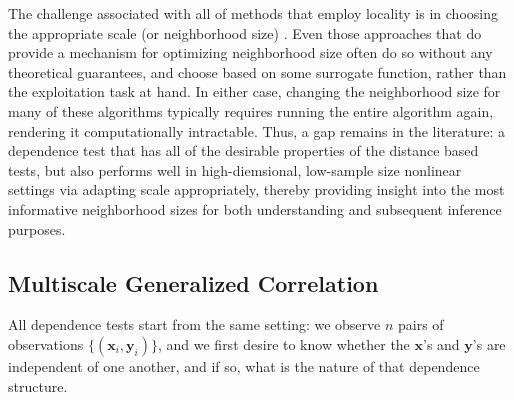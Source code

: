 \documentclass[11pt]{article}
\providecommand{\mb}[1]{\boldsymbol{#1}}
\newcommand{\mbx}{\ensuremath{\mb{x}}}
\newcommand{\mby}{\ensuremath{\mb{y}}}
\begin{document}
The challenge associated with all of methods that employ locality is in choosing the appropriate scale (or neighborhood size) \cite{ShenVogelsteinPriebe2016}.  Even those approaches that do provide a mechanism for optimizing  neighborhood size often do so without any theoretical guarantees, and choose based on some surrogate function, rather than the exploitation task at hand. In either case, changing the neighborhood size for many of these algorithms typically requires running the entire algorithm again, rendering it computationally intractable. 
Thus, a gap remains in the literature: a dependence test that has all of the desirable properties of the distance based tests, but also performs well in high-diemsional, low-sample size nonlinear settings via adapting scale appropriately, thereby providing insight into the most informative neighborhood sizes for both understanding and subsequent inference purposes.  




\subsection*{Multiscale Generalized Correlation}
\label{s:mgc}

All dependence tests start from the same setting: we observe $n$ pairs of observations $\{(\mb{x}_i,\mb{y}_i)\}$, and we first desire to know whether the \mbx's and \mby's are independent of one another, and if so, what is the nature of that dependence structure.
\end{document}
